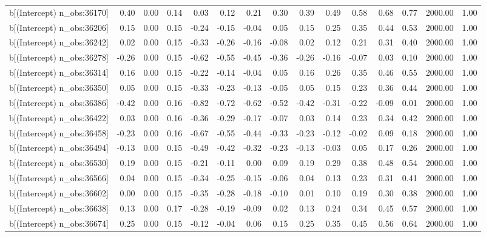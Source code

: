 \begin{table}[ht]
\begin{tabular}{rrrrrrrrrrrrrrr}
  b[(Intercept) n\_obs:36170] & 0.40 & 0.00 & 0.14 & 0.03 & 0.12 & 0.21 & 0.30 & 0.39 & 0.49 & 0.58 & 0.68 & 0.77 & 2000.00 & 1.00 \\ 
  b[(Intercept) n\_obs:36206] & 0.15 & 0.00 & 0.15 & -0.24 & -0.15 & -0.04 & 0.05 & 0.15 & 0.25 & 0.35 & 0.44 & 0.53 & 2000.00 & 1.00 \\ 
  b[(Intercept) n\_obs:36242] & 0.02 & 0.00 & 0.15 & -0.33 & -0.26 & -0.16 & -0.08 & 0.02 & 0.12 & 0.21 & 0.31 & 0.40 & 2000.00 & 1.00 \\ 
  b[(Intercept) n\_obs:36278] & -0.26 & 0.00 & 0.15 & -0.62 & -0.55 & -0.45 & -0.36 & -0.26 & -0.16 & -0.07 & 0.03 & 0.10 & 2000.00 & 1.00 \\ 
  b[(Intercept) n\_obs:36314] & 0.16 & 0.00 & 0.15 & -0.22 & -0.14 & -0.04 & 0.05 & 0.16 & 0.26 & 0.35 & 0.46 & 0.55 & 2000.00 & 1.00 \\ 
  b[(Intercept) n\_obs:36350] & 0.05 & 0.00 & 0.15 & -0.33 & -0.23 & -0.13 & -0.05 & 0.05 & 0.15 & 0.23 & 0.36 & 0.44 & 2000.00 & 1.00 \\ 
  b[(Intercept) n\_obs:36386] & -0.42 & 0.00 & 0.16 & -0.82 & -0.72 & -0.62 & -0.52 & -0.42 & -0.31 & -0.22 & -0.09 & 0.01 & 2000.00 & 1.00 \\ 
  b[(Intercept) n\_obs:36422] & 0.03 & 0.00 & 0.16 & -0.36 & -0.29 & -0.17 & -0.07 & 0.03 & 0.14 & 0.23 & 0.34 & 0.42 & 2000.00 & 1.00 \\ 
  b[(Intercept) n\_obs:36458] & -0.23 & 0.00 & 0.16 & -0.67 & -0.55 & -0.44 & -0.33 & -0.23 & -0.12 & -0.02 & 0.09 & 0.18 & 2000.00 & 1.00 \\ 
  b[(Intercept) n\_obs:36494] & -0.13 & 0.00 & 0.15 & -0.49 & -0.42 & -0.32 & -0.23 & -0.13 & -0.03 & 0.05 & 0.17 & 0.26 & 2000.00 & 1.00 \\ 
  b[(Intercept) n\_obs:36530] & 0.19 & 0.00 & 0.15 & -0.21 & -0.11 & 0.00 & 0.09 & 0.19 & 0.29 & 0.38 & 0.48 & 0.54 & 2000.00 & 1.00 \\ 
  b[(Intercept) n\_obs:36566] & 0.04 & 0.00 & 0.15 & -0.34 & -0.25 & -0.15 & -0.06 & 0.04 & 0.13 & 0.23 & 0.31 & 0.41 & 2000.00 & 1.00 \\ 
  b[(Intercept) n\_obs:36602] & 0.00 & 0.00 & 0.15 & -0.35 & -0.28 & -0.18 & -0.10 & 0.01 & 0.10 & 0.19 & 0.30 & 0.38 & 2000.00 & 1.00 \\ 
  b[(Intercept) n\_obs:36638] & 0.13 & 0.00 & 0.17 & -0.28 & -0.19 & -0.09 & 0.02 & 0.13 & 0.24 & 0.34 & 0.45 & 0.57 & 2000.00 & 1.00 \\ 
  b[(Intercept) n\_obs:36674] & 0.25 & 0.00 & 0.15 & -0.12 & -0.04 & 0.06 & 0.15 & 0.25 & 0.35 & 0.45 & 0.56 & 0.64 & 2000.00 & 1.00 \\ 

\end{tabular}
\end{table}
